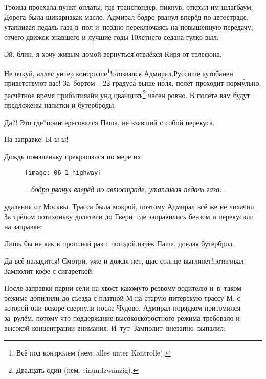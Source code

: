 Троица проехала пункт оплаты, где транспондер, пикнув, открыл им шлагбаум. Дорога была шикарна\mdash как масло. Адмирал бодро рванул вперёд по автостраде, утапливая педаль газа в~пол и~поздно переключаясь на повышенную передачу, отчего движок знавшего и лучшие годы 10\sdash летнего седана гулко выл:

\diagdash Эй, блин, я хочу живым домой вернуться!\mdash отвлёкся Киря от телефона.

\setcounter{footnote}{0}
\renewcommand*{\thefootnote}{\arabic{footnote}}

\diagdash Не очкуй, аллес унтер контролле\footnote{Всё под контролем (нем. alles unter Kontrolle).}!\mdash отозвался Адмирал.\mdash Руссише аутобанен приветствуют вас! За~бортом +22 градус\'{а} выше н\'{о}ля, полёт проходит норм\'{у}льно, расчётное время прибытия\mdash айн унд цв\'{а}нцихъ\footnote{Двадцать один (нем. einundzwanzig).} ч\'{а}сен ровно. В полёте вам будут предложены напитки и бутерброды.

\diagdash Да?! Это где?\mdash поинтересовался Паша, не взявший с собой перекуса.

\diagdash На заправке! Ы-ы-ы!

Дождь помаленьку прекращался по мере их

\newpage

{
\setlength{\belowcaptionskip}{-5mm}
\begin{figure}[h]
	\centering
	\texttt{[image: 06\_1\_highway]}
	\caption{\small\textit{...бодро рванул вперёд по автостраде, утапливая педаль газа...}}
\end{figure}

\noindent удаления от Москвы. Трасса была мокрой, поэтому Адмирал всё же не лихачил. За трёпом потихоньку долетели до Твери, где заправились бензом и перекусили на заправке:
}

\diagdash Лишь бы не как в прошлый раз с погодой.\mdash изрёк Паша, доедая бутерброд.

\diagdash Да всё наладится! Смотри, уже и дождя нет, щас солнце выглянет!\mdash потягивал Замполит кофе с сигареткой.

После заправки парни сели на хвост какому\sdash то резвому водителю и~в~таком режиме допилили до съезда с платной М на старую питерскую трассу М, с которой они вскоре свернули после Чудово. Адмирал порядком притомился за~рулём, потому что поддержание высокоскоростного режима требовало и высокой концентрации внимания. И~тут~Замполит~внезапно~выпалил:

